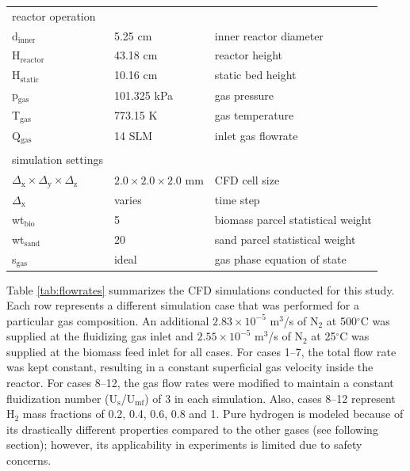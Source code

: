\documentclass{article}
\begin{document}
\begin{table}[H]
\begin{tabular}{lll}
        \\
        reactor operation \\
        d$_\text{inner}$      & 5.25 cm       & inner reactor diameter \\
        H$_\text{reactor}$    & 43.18 cm      & reactor height \\
        H$_\text{static}$     & 10.16 cm      & static bed height \\
        p$_\text{gas}$        & 101.325 kPa   & gas pressure \\
        T$_\text{gas}$        & 773.15 K      & gas temperature \\
        Q$_\text{gas}$        & 14 SLM        & inlet gas flowrate \\
        \\
        simulation settings \\
        $\Delta_\text{x} \times \Delta_\text{y} \times \Delta_\text{z}$ & $2.0 \times 2.0 \times 2.0$ mm & CFD cell size \\
        $\Delta_\text{x}$   & varies & time step \\
        wt$_\text{bio}$      & 5     & biomass parcel statistical weight \\
        wt$_\text{sand}$     & 20     & sand parcel statistical weight \\
        s$_\text{gas}$               & ideal  & gas phase equation of state \\
        \bottomrule
    \end{tabular}
\end{table}

Table \ref{tab:flowrates} summarizes the CFD simulations conducted for this study. Each row represents a different simulation case that was performed for a particular gas composition. An additional $2.83\times10^{-5}$ m$^3$/s of N$_2$ at 500$^\circ$C was supplied at the fluidizing gas inlet and $2.55\times10^{-5}$ m$^3$/s of N$_2$ at 25$^\circ$C was supplied at the biomass feed inlet for all cases. For cases 1--7, the total flow rate was kept constant, resulting in a constant superficial gas velocity inside the reactor. For cases 8--12, the gas flow rates were modified to maintain a constant fluidization number (U$_\text{s}$/U$_\text{mf}$) of 3 in each simulation. Also, cases 8--12 represent H$_2$ mass fractions of 0.2, 0.4, 0.6, 0.8 and 1. Pure hydrogen is modeled because of its drastically different properties compared to the other gases (see following section); however, its applicability in experiments is limited due to safety concerns.
\end{document}
